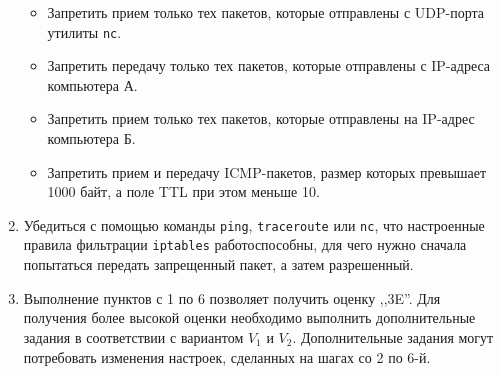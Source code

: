 \begin{enumerate}
\begin{itemize}
        \item Запретить прием только тех пакетов, которые отправлены с UDP-порта утилиты \texttt{nc}.

        \item Запретить передачу только тех пакетов, которые отправлены с IP-адреса компьютера А.

        \item Запретить прием только тех пакетов, которые отправлены на IP-адрес компьютера Б.

        \item Запретить прием и передачу ICMP-пакетов, размер которых превышает 1000 байт,
        а поле TTL при этом меньше 10.
    \end{itemize}

    \item Убедиться с помощью команды \texttt{ping}, \texttt{traceroute} или \texttt{nc},
    что настроенные правила фильтрации \texttt{iptables} работоспособны,
    для чего нужно сначала попытаться передать запрещенный пакет, а затем разрешенный.

    \item Выполнение пунктов с 1 по 6 позволяет получить оценку ,,3E''.
    Для получения более высокой оценки необходимо выполнить дополнительные задания в соответствии с вариантом
    $V_1$ и $V_2$.
    Дополнительные задания могут потребовать изменения настроек, сделанных на шагах со 2 по 6-й.
\end{enumerate}
